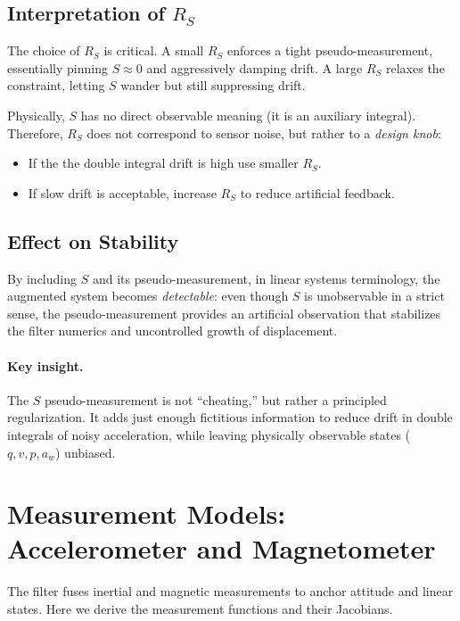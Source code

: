 \documentclass[10pt]{extarticle}
\begin{document}
\subsection{Interpretation of $R_S$}
The choice of $R_S$ is critical. A small $R_S$ enforces a tight pseudo-measurement,
essentially pinning $S\approx 0$ and aggressively damping drift. A large $R_S$ relaxes
the constraint, letting $S$ wander but still suppressing drift.

Physically, $S$ has no direct observable meaning (it is an auxiliary integral).
Therefore, $R_S$ does not correspond to sensor noise, but rather to a 
\emph{design knob}:
\begin{itemize}
\item If the the double integral drift is high use smaller $R_S$.
\item If slow drift is acceptable, increase $R_S$ to reduce artificial feedback.
\end{itemize}

\subsection{Effect on Stability}
By including $S$ and its pseudo-measurement, in linear systems terminology, the augmented
system becomes \emph{detectable}: even though $S$ is unobservable in a strict sense, the 
pseudo-measurement provides an artificial observation that stabilizes the filter numerics and
uncontrolled growth of displacement.

\paragraph{Key insight.} 
The $S$ pseudo-measurement is not “cheating,” but rather a principled
regularization. It adds just enough fictitious information to reduce drift in double integrals of noisy acceleration, 
while leaving physically observable states ($q,v,p,a_w$) unbiased.

\section{Measurement Models: Accelerometer and Magnetometer}
\label{sec:meas-models}

The filter fuses inertial and magnetic measurements to anchor attitude and
linear states. Here we derive the measurement functions and their Jacobians.
\end{document}
